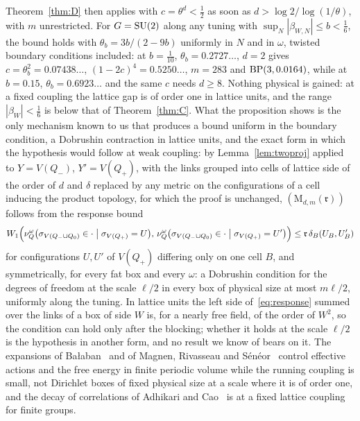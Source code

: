 Theorem~\ref{thm:D} then applies with $c=\theta^d<\frac12$ as soon as
$d>\log2/\log(1/\theta)$, with $m$ unrestricted. For $G=\mathrm{SU}(2)$ along any tuning with $\sup_N|\beta_{W,N}|\le b<\frac16$,
the bound holds with $\theta_b=3b/(2-9b)$ uniformly in $N$ and in $\omega$,
twisted boundary conditions included: at $b=\frac1{10}$, $\theta_b=0.2727
\ldots$, $d=2$ gives $c=\theta_b^2=0.07438\ldots$, $(1-2c)^4=0.5250\ldots$,
$m=283$ and $\mathrm{BP}(3,0.0164)$, while at $b=0.15$, $\theta_b=0.6923\ldots$ and
the same $c$ needs $d\ge8$. Nothing physical is gained:
at a fixed coupling the lattice gap is of order one in lattice units, and
the range $|\beta_W|<\frac16$ is below that of Theorem~\ref{thm:C}. What the
proposition shows is the only mechanism known to us that produces a bound
uniform in the boundary condition, a Dobrushin contraction in lattice
units, and the exact form in which the hypothesis would follow at weak
coupling: by Lemma~\ref{lem:twoproj} applied to $Y=V(Q_-)$, $Y'=V(Q_+)$,
with the links grouped into cells of lattice side of the order of $d$ and
$\delta$ replaced by any metric on the configurations of a cell inducing
the product topology, for which the proof is unchanged,
$(\mathrm M_{d,m}(\mathfrak r))$ follows from the response bound
\begin{equation}\label{eq:response}
W_1\Bigl(\nu^\omega_Q\bigl(\sigma_{V(Q_-\cup Q_0)}\in\cdot\bigm|\sigma_{V(Q_+)}
=U\bigr),\,\nu^\omega_Q\bigl(\sigma_{V(Q_-\cup Q_0)}\in\cdot\bigm|
\sigma_{V(Q_+)}=U'\bigr)\Bigr)\le\mathfrak r\,\delta_B(U_B,U'_B)
\end{equation}
for configurations $U,U'$ of $V(Q_+)$ differing only on one cell $B$, and
symmetrically, for every fat box and every $\omega$: a Dobrushin condition
for the degrees of freedom at the scale $\ell/2$ in every box of physical
size at most $m\ell/2$, uniformly along the tuning. In lattice units the
left side of~\eqref{eq:response} summed over the links of a box of side
$W$ is, for a nearly free field, of the order of $W^2$, so the condition
can hold only after the blocking; whether it holds at the scale $\ell/2$
is the hypothesis in another form, and no result we know of bears on it.
The expansions of Ba\l aban~\cite{Bal84a,Bal85a,Bal89b} and of Magnen,
Rivasseau and S\'en\'eor~\cite{MRS93} control effective actions and the
free energy in finite periodic volume while the running coupling is small,
not Dirichlet boxes of fixed physical size at a scale where it is of order
one, and the decay of correlations of Adhikari and Cao~\cite{AC25} is at a
fixed lattice coupling for finite groups.

